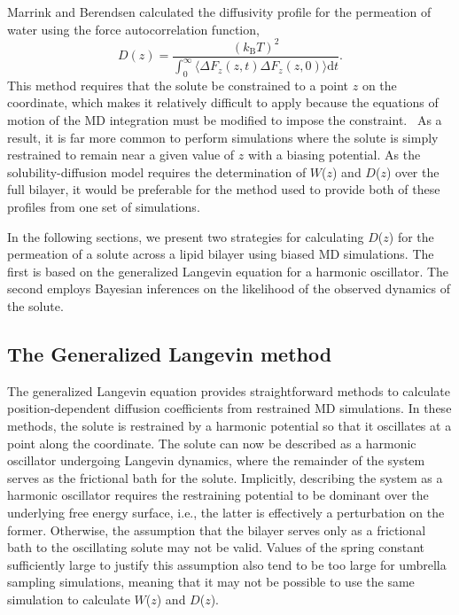 \par Marrink and Berendsen calculated the diffusivity profile for the permeation of water using the force autocorrelation function,~\cite{Marrink1994,Marrink1996}
\begin{equation}
D(z) = \frac{(k_\mathrm{B} T)^2}{\displaystyle \int_0^\infty \langle {\Delta}F_z(z,t)  {\Delta}F_z(z,0) \rangle \textrm{d}t}.
\label{eq:diff_marrink}
\end{equation}
This method requires that the solute be constrained to a point $z$ on the coordinate, which makes it relatively difficult to apply because the equations of motion of the MD integration must be modified to impose the constraint.~\cite{Wilson1985,Mamonov2006} As a result, it is far more common to perform simulations where the solute is simply restrained to remain near a given value of $z$ with a biasing potential. As the solubility-diffusion model requires the determination of $W$($z$) and $D$($z$) over the full bilayer, it would be preferable for the method used to provide both of these profiles from one set of simulations.

\par In the following sections, we present two strategies for calculating $D$($z$) for the permeation of a solute across a lipid bilayer using biased MD simulations. The first is based on the generalized Langevin equation for a harmonic oscillator. The second employs Bayesian inferences on the likelihood of the observed dynamics of the solute.

\subsection{The Generalized Langevin method}
\par The generalized Langevin equation provides straightforward methods to calculate
position-dependent diffusion coefficients from restrained MD simulations. In these methods, the solute is restrained by a harmonic potential so that it oscillates at a point along the coordinate. The solute can now be described as a harmonic oscillator undergoing Langevin dynamics, where the remainder of the system
serves as the frictional bath for the solute. Implicitly, describing the system as a harmonic oscillator requires the restraining potential to be dominant over the underlying free energy surface, i.e., the latter is effectively a perturbation on the former.
Otherwise,
the assumption that the bilayer serves only as a frictional bath to the oscillating solute may not be valid.  Values of the spring constant sufficiently large to justify this assumption also tend to be too large for umbrella sampling simulations, meaning that it may not be possible to use the same simulation to calculate $W$($z$) and $D$($z$).

